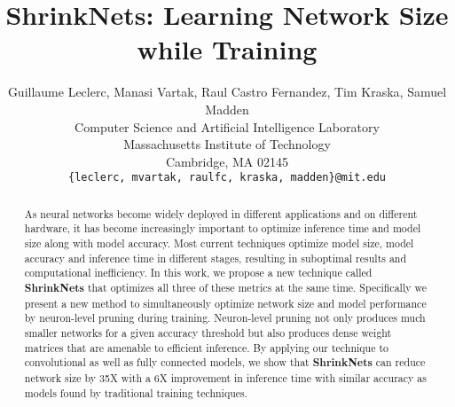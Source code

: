 \documentclass{article}
\title{ShrinkNets: Learning Network Size while Training}
\author{
  Guillaume Leclerc, Manasi Vartak, Raul Castro Fernandez, Tim Kraska, Samuel Madden \\
  Computer Science and Artificial Intelligence Laboratory\\
  Massachusetts Institute of Technology\\
  Cambridge, MA 02145 \\
  \texttt{\{leclerc, mvartak, raulfc, kraska, madden\}@mit.edu} \\
}
\newcommand{\shrink}{{\bf ShrinkNets}\xspace}
\begin{document}

\maketitle

\begin{abstract}
As neural networks become widely deployed in different applications and on
different hardware, it has become increasingly important to optimize inference
time and model size along with model accuracy.  Most current techniques
optimize model size, model accuracy and inference time in different stages,
resulting in suboptimal results and computational inefficiency.  In this work,
we propose a new technique called \shrink that optimizes all three of these
metrics at the same time.  Specifically we present a new method to
simultaneously optimize network size and model performance by neuron-level
pruning during training.  Neuron-level pruning not only produces much smaller
networks for a given accuracy threshold but also produces dense weight matrices
that are amenable to efficient inference.  By applying our technique to
convolutional as well as fully connected models, we show that \shrink can
reduce network size by 35X with a 6X improvement in inference time with similar
accuracy as models found by traditional training techniques. 
\end{abstract}







% 


\end{document}
